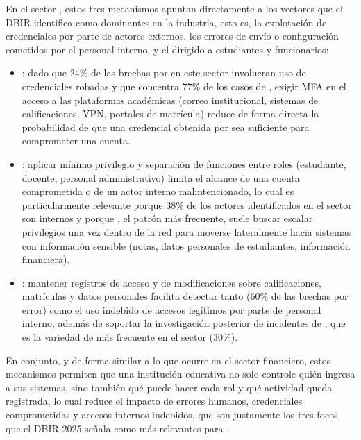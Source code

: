 \begin{respuesta}
  En el sector , estos tres mecanismos apuntan directamente a los vectores que el DBIR identifica como dominantes en la industria, esto es, la explotación de credenciales por parte de actores externos, los errores de envío o configuración cometidos por el personal interno, y el  dirigido a estudiantes y funcionarios:
  \begin{itemize}
    \item {}: dado que 24\% de las brechas por  en este sector involucran uso de credenciales robadas y que  concentra 77\% de los casos de , exigir MFA en el acceso a las plataformas académicas (correo institucional, sistemas de calificaciones, VPN, portales de matrícula) reduce de forma directa la probabilidad de que una credencial obtenida por  sea suficiente para comprometer una cuenta.
    \item {}: aplicar mínimo privilegio y separación de funciones entre roles (estudiante, docente, personal administrativo) limita el alcance de una cuenta comprometida o de un actor interno malintencionado, lo cual es particularmente relevante porque 38\% de los actores identificados en el sector son internos y porque , el patrón más frecuente, suele buscar escalar privilegios una vez dentro de la red para moverse lateralmente hacia sistemas con información sensible (notas, datos personales de estudiantes, información financiera).
    \item {}: mantener registros de acceso y de modificaciones sobre calificaciones, matrículas y datos personales facilita detectar tanto  (60\% de las brechas por error) como el uso indebido de accesos legítimos por parte de personal interno, además de soportar la investigación posterior de incidentes de , que es la variedad de  más frecuente en el sector (30\%).
  \end{itemize}
  En conjunto, y de forma similar a lo que ocurre en el sector financiero, estos mecanismos permiten que una institución educativa no solo controle quién ingresa a sus sistemas, sino también qué puede hacer cada rol y qué actividad queda registrada, lo cual reduce el impacto de errores humanos, credenciales comprometidas y accesos internos indebidos, que son justamente los tres focos que el DBIR 2025 señala como más relevantes para .
\end{respuesta}

